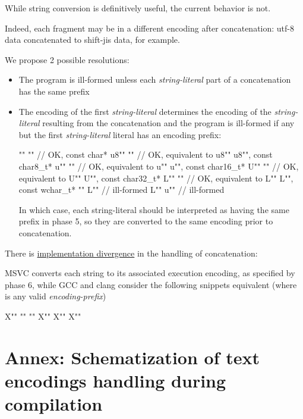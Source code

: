 \documentclass{wg21}
\begin{document}
While string conversion is definitively useful, the current behavior is not.

Indeed, each fragment may be in a different encoding after concatenation: utf-8 data concatenated to shift-jis data, for example.

We propose 2 possible resolutions:

\begin{itemize}
    \item The program is ill-formed unless each \emph{string-literal} part of a concatenation has the same prefix
    
    \item The encoding of the first  \emph{string-literal} determines the encoding of the  \emph{string-literal} resulting from the concatenation and the program is ill-formed if any but the first  \emph{string-literal} literal has an encoding prefix:

\begin{colorblock}
"" ""    // OK, const char*
u8"" ""  // OK, equivalent to u8"" u8"", const char8_t*
u"" ""   // OK, equivalent to u"" u"", const char16_t*
U"" ""   // OK, equivalent to U"" U"", const char32_t*
L"" ""   // OK, equivalent to L"" L"", const wchar_t*
"" L""    // ill-formed
L"" u""   // ill-formed

\end{colorblock}


In which case, each string-literal should be interpreted as having the same prefix in phase 5, so they are converted to the same encoding
prior to concatenation.

\end{itemize}

There is \href{https://godbolt.org/z/-5BTcT}{implementation divergence} in the handling of concatenation:

MSVC converts each string to its associated execution encoding, as specified by phase 6,
while GCC and clang consider the following snippets equivalent (where  is any valid \emph{encoding-prefix})

\begin{colorblock}
    X""  ""
     "" X""
    X"" X""
\end{colorblock}




\pagebreak

\section{Annex: Schematization of text encodings handling during compilation}
\end{document}
